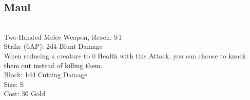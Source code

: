 \subsection{Maul}\label{weapon:maul}\\
Two-Handed Melee Weapon,  Reach, ST\\
Strike (6AP): 2d4 Blunt Damage\\
When reducing a creature to 0 Health with this Attack, you can choose to knock them out instead of killing them.\\
Block: 1d4 Cutting Damage\\
Size: S\\
Cost: 30 Gold\\